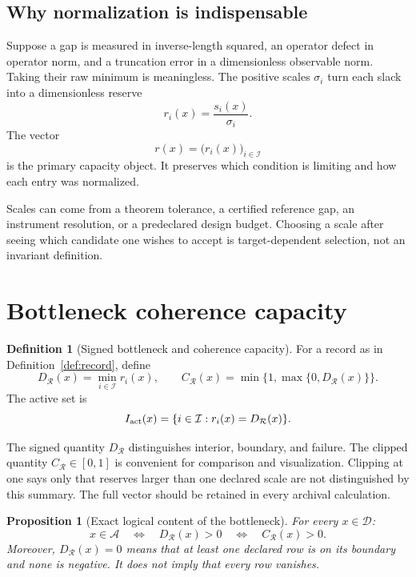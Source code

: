 \documentclass[11pt]{article}
\newtheorem{proposition}[theorem]{Proposition}
\theoremstyle{definition}
\newtheorem{definition}[theorem]{Definition}
\theoremstyle{remark}
\newcommand{\cA}{\mathcal A}
\newcommand{\cD}{\mathcal D}
\newcommand{\cI}{\mathcal I}
\newcommand{\cR}{\mathcal R}
\begin{document}
\subsection{Why normalization is indispensable}

Suppose a gap is measured in inverse-length squared, an operator defect in
operator norm, and a truncation error in a dimensionless observable norm.
Taking their raw minimum is meaningless.  The positive scales
\(\sigma_i\) turn each slack into a dimensionless reserve
\[
 r_i(x)=\frac{s_i(x)}{\sigma_i}.
\]
The vector
\[
 r(x)=\bigl(r_i(x)\bigr)_{i\in\cI}
\]
is the primary capacity object.  It preserves which condition is limiting
and how each entry was normalized.

Scales can come from a theorem tolerance, a certified reference gap, an
instrument resolution, or a predeclared design budget.  Choosing a scale
after seeing which candidate one wishes to accept is target-dependent
selection, not an invariant definition.

\section{Bottleneck coherence capacity}
\label{sec:bottleneck}

\begin{definition}[Signed bottleneck and coherence capacity]
\label{def:capacity}
For a record as in Definition~\ref{def:record}, define
\[
 D_{\cR}(x)=\min_{i\in\cI}r_i(x),
 \qquad
 C_{\cR}(x)=\min\{1,\max\{0,D_{\cR}(x)\}\}.
\]
The active set is
\[
 I_{\rm act}(x)
 =
 \{i\in\cI:r_i(x)=D_{\cR}(x)\}.
\]
\end{definition}

The signed quantity \(D_{\cR}\) distinguishes interior, boundary, and
failure.  The clipped quantity \(C_{\cR}\in[0,1]\) is convenient for
comparison and visualization.  Clipping at one says only that reserves
larger than one declared scale are not distinguished by this summary.
The full vector should be retained in every archival calculation.

\begin{proposition}[Exact logical content of the bottleneck]
\label{prop:logical}
For every \(x\in\cD\):
\[
 x\in\cA
 \quad\Longleftrightarrow\quad
 D_{\cR}(x)>0
 \quad\Longleftrightarrow\quad
 C_{\cR}(x)>0.
\]
Moreover, \(D_{\cR}(x)=0\) means that at least one declared row is on its
boundary and none is negative.  It does not imply that every row vanishes.
\end{proposition}
\end{document}
